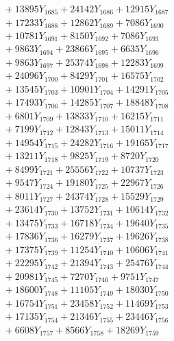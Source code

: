 \documentclass[a4paper,10pt]{article}
\begin{document}
{\begin{align}
&\;  + 13895 Y_{1685} + 24142 Y_{1686} + 12915 Y_{1687} \\[0.3ex]
&\;  + 17233 Y_{1688} + 12862 Y_{1689} + 7086 Y_{1690} \\[0.3ex]
&\;  + 10781 Y_{1691} + 8150 Y_{1692} + 7086 Y_{1693} \\[0.3ex]
&\;  + 9863 Y_{1694} + 23866 Y_{1695} + 6635 Y_{1696} \\[0.3ex]
&\;  + 9863 Y_{1697} + 25374 Y_{1698} + 12283 Y_{1699} \\[0.3ex]
&\;  + 24096 Y_{1700} + 8429 Y_{1701} + 16575 Y_{1702} \\[0.3ex]
&\;  + 13545 Y_{1703} + 10901 Y_{1704} + 14291 Y_{1705} \\[0.3ex]
&\;  + 17493 Y_{1706} + 14285 Y_{1707} + 18848 Y_{1708} \\[0.5ex]\allowbreak
&\;  + 6801 Y_{1709} + 13833 Y_{1710} + 16215 Y_{1711} \\[0.3ex]
&\;  + 7199 Y_{1712} + 12843 Y_{1713} + 15011 Y_{1714} \\[0.3ex]
&\;  + 14954 Y_{1715} + 24282 Y_{1716} + 19165 Y_{1717} \\[0.3ex]
&\;  + 13211 Y_{1718} + 9825 Y_{1719} + 8720 Y_{1720} \\[0.3ex]
&\;  + 8499 Y_{1721} + 25556 Y_{1722} + 10737 Y_{1723} \\[0.3ex]
&\;  + 9547 Y_{1724} + 19180 Y_{1725} + 22967 Y_{1726} \\[0.3ex]
&\;  + 8011 Y_{1727} + 24374 Y_{1728} + 15529 Y_{1729} \\[0.3ex]
&\;  + 23614 Y_{1730} + 13752 Y_{1731} + 10614 Y_{1732} \\[0.3ex]
&\;  + 13475 Y_{1733} + 16718 Y_{1734} + 19640 Y_{1735} \\[0.3ex]
&\;  + 17836 Y_{1736} + 16279 Y_{1737} + 19626 Y_{1738} \\[0.5ex]\allowbreak
&\;  + 17375 Y_{1739} + 11254 Y_{1740} + 10606 Y_{1741} \\[0.3ex]
&\;  + 22295 Y_{1742} + 21394 Y_{1743} + 25476 Y_{1744} \\[0.3ex]
&\;  + 20981 Y_{1745} + 7270 Y_{1746} + 9751 Y_{1747} \\[0.3ex]
&\;  + 18600 Y_{1748} + 11105 Y_{1749} + 18030 Y_{1750} \\[0.3ex]
&\;  + 16754 Y_{1751} + 23458 Y_{1752} + 11469 Y_{1753} \\[0.3ex]
&\;  + 17135 Y_{1754} + 21346 Y_{1755} + 23446 Y_{1756} \\[0.3ex]
&\;  + 6608 Y_{1757} + 8566 Y_{1758} + 18269 Y_{1759} \\[0.3ex]

\end{align}}
\end{document}
